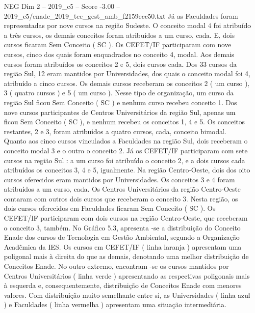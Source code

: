 \begin{textsample}{NEG Dim 2 – 2019\_c5 – Score -3.00 – 2019\_c5/enade\_2019\_tec\_gest\_amb\_f2159ecc50.txt}
Já as Faculdades foram representadas por nove cursos na região Sudeste.
O conceito modal 4 foi atribuído a três cursos, os demais conceitos foram atribuídos a um curso, cada.
E, dois cursos ficaram Sem Conceito ( SC ).
Os CEFET/IF participaram com nove cursos, cinco dos quais foram enquadrados no conceito 4, modal.
Aos demais cursos foram atribuídos os conceitos 2 e 5, dois cursos cada.
Dos 33 cursos da região Sul, 12 eram mantidos por Universidades, dos quais o conceito modal foi 4, atribuído a cinco cursos.
Os demais cursos receberam os conceitos 2 ( um curso ), 3 ( quatro cursos ) e 5 ( um curso ).
Nesse tipo de organização, um curso da região Sul ficou Sem Conceito ( SC ) e nenhum curso recebeu conceito 1.
Dos nove cursos participantes de Centros Universitários da região Sul, apenas um ficou Sem Conceito ( SC ), e nenhum recebeu os conceitos 1, 4 e 5.
Os conceitos restantes, 2 e 3, foram atribuídos a quatro cursos, cada, conceito bimodal.
Quanto aos cinco cursos vinculados a Faculdades na região Sul, dois receberam o conceito modal 3 e o outro o conceito 2.
Já os CEFET/IF participaram com sete cursos na região Sul : a um curso foi atribuído o conceito 2, e a dois cursos cada atribuídos os conceitos 3, 4 e 5, igualmente.
Na região Centro-Oeste, dois dos oito cursos oferecidos eram mantidos por Universidades.
Os conceitos 3 e 4 foram atribuídos a um curso, cada.
Os Centros Universitários da região Centro-Oeste contaram com outros dois cursos que receberam o conceito 3.
Nesta região, os dois cursos oferecidos em Faculdades ficaram Sem Conceito ( SC ).
Os CEFET/IF participaram com dois cursos na região Centro-Oeste, que receberam o conceito 3, também.
No Gráfico 5.3, apresenta -se a distribuição do Conceito Enade dos cursos de Tecnologia em Gestão Ambiental, segundo a Organização Acadêmica da IES.
Os cursos em CEFET/IF ( linha laranja ) apresentam uma poligonal mais à direita do que as demais, denotando uma melhor distribuição de Conceitos Enade.
No outro extremo, encontram -se os cursos mantidos por Centros Universitários ( linha verde ) apresentando as respectivas poligonais mais à esquerda e, consequentemente, distribuição de Conceitos Enade com menores valores.
Com distribuição muito semelhante entre si, as Universidades ( linha azul ) e Faculdades ( linha vermelha ) apresentam uma situação intermediária.

\end{textsample}
